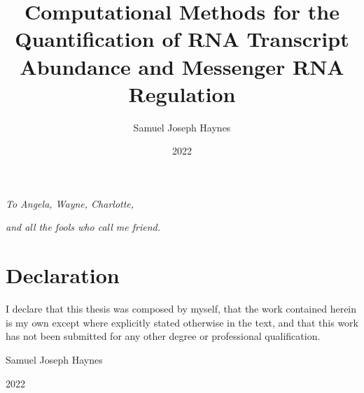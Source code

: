\documentclass{SBCbookchapter}
\begin{document}
\title{Computational Methods for the Quantification of RNA Transcript Abundance and Messenger RNA Regulation}
\author{Samuel Joseph Haynes}
\date{2022}
\makethesistitle

\newpage

\renewcommand{\thepage}{\roman{page}}


\vspace*{\fill}
\begin{center}
\textit{To Angela, Wayne, Charlotte,}

\textit{and all the fools who call me friend.}
\end{center}
\vspace*{\fill}


\newpage

\chapter{Declaration}
I declare that this thesis was composed by myself, that the work contained herein is my own except where explicitly stated otherwise in the text, and that this work has not been submitted for any other degree or professional qualification.

\begin{flushright}
Samuel Joseph Haynes

2022
\end{flushright}

\newpage




\newpage




\newpage




\newpage

\tableofcontents
\end{document}
